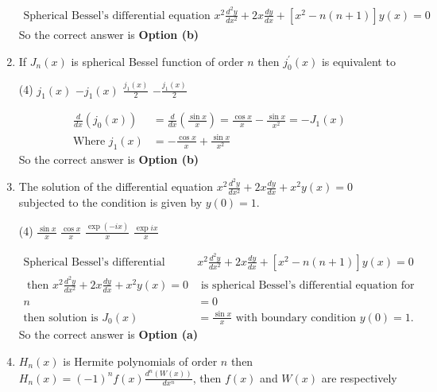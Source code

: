 \begin{enumerate}[label=\color{ocre}\textbf{\arabic*.}]
\begin{answer}
\begin{align*}
\text{Spherical Bessel's differential equation }x^{2} \frac{d^{2} y}{d x^{2}}+2 x \frac{d y}{d x}+\left[x^{2}-n(n+1)\right] y(x)=0
	\end{align*}
		So the correct answer is \textbf{Option (b)}
\end{answer}
\item If $J_{n}(x)$ is spherical Bessel function of order $n$ then $j_{0}^{\prime}(x)$ is equivalent to
 \begin{tasks}(4)
	\task[\textbf{a.}]$j_{1}(x)$
	\task[\textbf{b.}]$-j_{1}(x)$
	\task[\textbf{c.}]$\frac{j_{1}(x)}{2}$
	\task[\textbf{d.}]$-\frac{j_{1}(x)}{2}$
\end{tasks}
\begin{answer}
	\begin{align*}
	\frac{d}{d x}\left(j_{0}(x)\right)&=\frac{d}{d x}\left(\frac{\sin x}{x}\right)=\frac{\cos x}{x}-\frac{\sin x}{x^{2}}=-J_{1}(x)\\
	\text{Where }j_{1}(x)&=-\frac{\cos x}{x}+\frac{\sin x}{x^{2}}
	\end{align*}
	So the correct answer is \textbf{Option (b)}
\end{answer}
\item The solution of the differential equation $x^{2} \frac{d^{2} y}{d x^{2}}+2 x \frac{d y}{d x}+x^{2} y(x)=0$ subjected to the condition is given by $y(0)=1$.
 \begin{tasks}(4)
	\task[\textbf{a.}] $\frac{\sin x}{x}$
	\task[\textbf{b.}] $\frac{\cos x}{x}$
	\task[\textbf{c.}]$\frac{\exp (-i x)}{x}$
	\task[\textbf{d.}] $\frac{\exp i x}{x}$
\end{tasks}
\begin{answer}
	\begin{align*}
 \text{Spherical Bessel's differential equation }&x^{2} \frac{d^{2} y}{d x^{2}}+2 x \frac{d y}{d x}+\left[x^{2}-n(n+1)\right] y(x)=0\\
 \text{ then }x^{2} \frac{d^{2} y}{d x^{2}}+2 x \frac{d y}{d x}+x^{2} y(x)=0 &\text{ is spherical Bessel's differential equation for order}\\
 n&=0\\
	\text{then solution is }J_{0}(x)&=\frac{\sin x}{x}\text{ with boundary condition }y(0)=1.
	\end{align*}
	So the correct answer is \textbf{Option (a)}
\end{answer}
\item $H_{n}(x)$ is Hermite polynomials of order $n$ then $H_{n}(x)=(-1)^{n} f(x) \frac{d^{n}(W(x))}{d x^{n}}$, then $f(x)$ and $W(x)$ are respectively

\end{enumerate}
